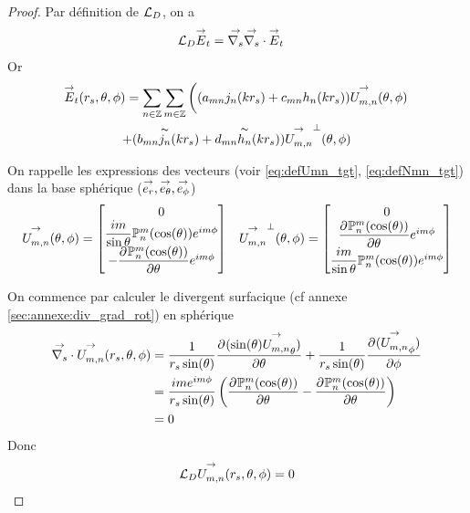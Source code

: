     \begin{proof}
      Par définition de \({\mathcal{L}_D}\), on a
      \begin{align*}
        {\mathcal{L}_D} {\overset{\rightarrow}{E}}_t & = {\overset{\rightarrow}{\nabla_s}}{} {\overset{\rightarrow}{\nabla_s}} \cdot{} {\overset{\rightarrow}{E}}_t
      \end{align*}
      Or 
      \begin{multline*}
        {\overset{\rightarrow}{E}}_t(r_s,\theta,\phi) = \sum_{n\in\mathbb Z}\sum_{m\in\mathbb Z} \left( (a_{mn} j_n(kr_s) + c_{mn}h_n(kr_s)) {\overset{\rightarrow}{U_{m,n}^{{}}}}(\theta,\phi) 
        \right.
        \\
        \left.
        + (b_{mn} \overset{\thicksim}{j_n}(kr_s)+d_{mn} \overset{\thicksim}{h_n}(kr_s)) {\overset{\rightarrow}{U_{m,n}^{{}}}}^\perp(\theta,\phi)\right.
      \end{multline*}

      On rappelle  les expressions des vecteurs (voir \eqref{eq:defUmn_tgt}, \eqref{eq:defNmn_tgt}) dans la base sphérique (\({\overset{\rightarrow}{e_r}},{\overset{\rightarrow}{e_\theta}},{\overset{\rightarrow}{e_\phi}}\))
      \begin{align*}
        {\overset{\rightarrow}{U_{m,n}^{{}}}}(\theta,\phi) =
        \begin{bmatrix}
            0
            \\
            \dfrac{im}{\sin\theta}\mathbb{P}^m_n(\cos(\theta))e^{im\phi}
            \\
            - \dfrac{\partial^{{}} \mathbb{P}^m_n(\cos(\theta))}{{\partial \theta}^{{}}}e^{im\phi}
        \end{bmatrix}
        &&
        {\overset{\rightarrow}{U_{m,n}^{{}}}}^\perp(\theta,\phi) =
        \begin{bmatrix}
          0
          \\
          \dfrac{\partial^{{}} \mathbb{P}^m_n(\cos(\theta))}{{\partial \theta}^{{}}}e^{im\phi}
          \\
          \dfrac{im}{\sin\theta}\mathbb{P}^m_n(\cos(\theta))e^{im\phi}
        \end{bmatrix}
      \end{align*}

      On commence par calculer le divergent surfacique (cf annexe \ref{sec:annexe:div_grad_rot}) en sphérique
      \begin{align*}
        {\overset{\rightarrow}{\nabla_s}} \cdot{}{\overset{\rightarrow}{U_{m,n}^{{}}}}(r_s,\theta,\phi) &= \dfrac{1}{r_s\sin(\theta)} \dfrac{\partial^{{}} (\sin(\theta){\overset{\rightarrow}{U_{m,n}^{{}}}}_\theta)}{{\partial \theta}^{{}}} + \dfrac{1}{r_s\sin(\theta)}\dfrac{\partial^{{}} ({\overset{\rightarrow}{U_{m,n}^{{}}}}_\phi)}{{\partial \phi}^{{}}}
        \\
        &=\dfrac{ime^{im\phi}}{r_s\sin(\theta)}\left( \dfrac{\partial^{{}} \mathbb{P}^m_n(\cos(\theta))}{{\partial \theta}^{{}}} - \dfrac{\partial^{{}} \mathbb{P}^m_n(\cos(\theta))}{{\partial \theta}^{{}}} \right)
        \\
        &= 0
      \end{align*}
      Donc 
      \begin{align*}
        {\mathcal{L}_D}{\overset{\rightarrow}{U_{m,n}^{{}}}}(r_s,\theta,\phi) = 0
      \end{align*}


\end{proof}
